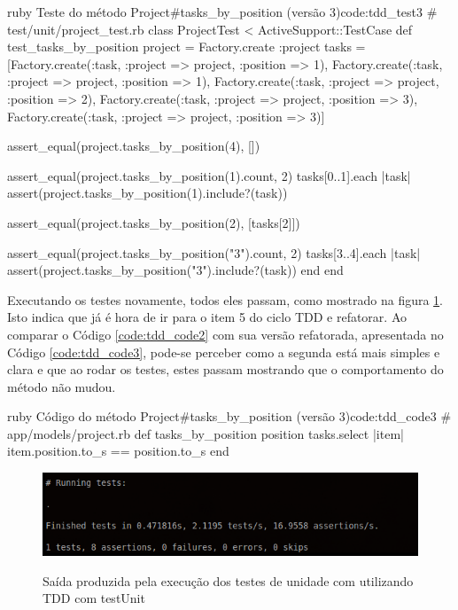 \begin{mycode}{ruby}%
{Teste do método Project\#tasks\_by\_position (versão 3)}{code:tdd_test3}
# test/unit/project_test.rb
class ProjectTest < ActiveSupport::TestCase
  def test_tasks_by_position
    project = Factory.create :project
    tasks = [Factory.create(:task, :project => project, :position => 1),
             Factory.create(:task, :project => project, :position => 1),
             Factory.create(:task, :project => project, :position => 2),
             Factory.create(:task, :project => project, :position => 3),
             Factory.create(:task, :project => project, :position => 3)]

    assert_equal(project.tasks_by_position(4), [])

    assert_equal(project.tasks_by_position(1).count, 2)
    tasks[0..1].each { |task| assert(project.tasks_by_position(1).include?(task)) }

    assert_equal(project.tasks_by_position(2), [tasks[2]])

    assert_equal(project.tasks_by_position("3").count, 2)
    tasks[3..4].each { |task| assert(project.tasks_by_position("3").include?(task)) }
  end
end
\end{mycode}

Executando os testes novamente, todos eles passam, como mostrado na figura \ref{img:test-unit-exec}. Isto indica que já é hora de ir para o item 5 do ciclo TDD e refatorar. Ao comparar o Código \ref{code:tdd_code2} com sua versão refatorada, apresentada no Código \ref{code:tdd_code3}, pode-se perceber como a segunda está mais simples e clara e que ao rodar os testes, estes passam mostrando que o comportamento do método não mudou.

\begin{mycode}{ruby}%
{Código do método Project\#tasks\_by\_position (versão 3)}{code:tdd_code3}
# app/models/project.rb
def tasks_by_position position
  tasks.select { |item| item.position.to_s == position.to_s }
end
\end{mycode}

\begin{figure}[h]
  \center
  \caption{Saída produzida pela execução dos testes de unidade com utilizando TDD com testUnit}
  \includegraphics[scale=0.6]{images/test-unit-exec}
  \label{img:test-unit-exec}
\end{figure}

